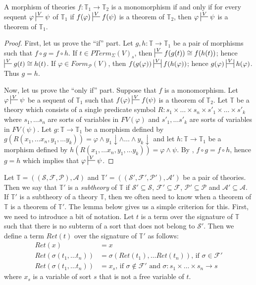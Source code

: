 \documentclass{elsarticle}
\theoremstyle{definition}
\theoremstyle{remark}
\numberwithin{figure}{section}
\begin{document}
\begin{prop}[mono]
A morphism of theories $f : \mathbb{T}_1 \to \mathbb{T}_2$ is a monomorphism if and only if for every sequent $\varphi \sststile{}{V} \psi$ of $\mathbb{T}_1$
if $f(\varphi) \sststile{}{V} f(\psi)$ is a theorem of $\mathbb{T}_2$, then $\varphi \sststile{}{V} \psi$ is a theorem of $\mathbb{T}_1$.
\end{prop}
\begin{proof}
First, let us prove the ``if'' part.
Let $g,h : \mathbb{T} \to \mathbb{T}_1$ be a pair of morphisms such that $f \circ g = f \circ h$.
If $t \in PTerm_\Sigma(V)_s$, then $\sststile{}{V} f(g(t)) \cong f(h(t))$; hence $\sststile{}{V} g(t) \cong h(t)$.
If $\varphi \in Form_\mathcal{P}(V)$, then $f(g(\varphi)) \ssststile{}{V} f(h(\varphi))$; hence $g(\varphi) \ssststile{}{V} h(\varphi)$.
Thus $g = h$.

Now, let us prove the ``only if'' part.
Suppose that $f$ is a monomorphism.
Let $\varphi \sststile{}{V} \psi$ be a sequent of $\mathbb{T}_1$ such that $f(\varphi) \sststile{}{V} f(\psi)$ is a theorem of $\mathbb{T}_2$.
Let $\mathbb{T}$ be a theory which consists of a single predicate symbol $R : s_1 \times \ldots \times s_n \times s'_1 \times \ldots \times s'_k$
where $s_1, \ldots s_n$ are sorts of variables in $FV(\varphi)$ and $s'_1, \ldots s'_k$ are sorts of variables in $FV(\psi)$.
Let $g : \mathbb{T} \to \mathbb{T}_1$ be a morphism defined by $g(R(x_1, \ldots x_n, y_1, \ldots y_k)) = \varphi \land y_1\!\downarrow \land \ldots \land y_k\!\downarrow$ and
let $h : \mathbb{T} \to \mathbb{T}_1$ be a morphism defined by $h(R(x_1, \ldots x_n, y_1, \ldots y_k)) = \varphi \land \psi$.
By , $f \circ g = f \circ h$, hence $g = h$ which implies that $\varphi \sststile{}{V} \psi$.
\end{proof}

Let $\mathbb{T} = ((\mathcal{S},\mathcal{F},\mathcal{P}),\mathcal{A})$ and $\mathbb{T}' = ((\mathcal{S}',\mathcal{F}',\mathcal{P}'),\mathcal{A}')$ be a pair of theories.
Then we say that $\mathbb{T}'$ is a \emph{subtheory} of $\mathbb{T}$ if $\mathcal{S}' \subseteq \mathcal{S}$, $\mathcal{F}' \subseteq \mathcal{F}$, $\mathcal{P}' \subseteq \mathcal{P}$ and $\mathcal{A}' \subseteq \mathcal{A}$.
If $\mathbb{T}'$ is a subtheory of a theory $\mathbb{T}$, then we often need to know when a theorem of $\mathbb{T}$ is a theorem of $\mathbb{T}'$.
The lemma below gives us a simple criterion for this.
First, we need to introduce a bit of notation.
Let $t$ is a term over the signature of $\mathbb{T}$ such that there is no subterm of a sort that does not belong to $\mathcal{S}'$.
Then we define a term $Ret(t)$ over the signature of $\mathbb{T}'$ as follows:
\begin{align*}
Ret(x) & = x \\
Ret(\sigma(t_1, \ldots t_n)) & = \sigma(Ret(t_1), \ldots Ret(t_n)) \text{, if $\sigma \in \mathcal{F}'$} \\
Ret(\sigma(t_1, \ldots t_n)) & = x_s \text{, if $\sigma \notin \mathcal{F}'$ and $\sigma : s_1 \times \ldots \times s_n \to s$}
\end{align*}
where $x_s$ is a variable of sort $s$ that is not a free variable of $t$.
\end{document}
